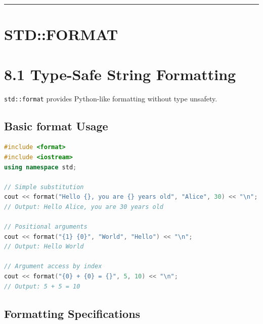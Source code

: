 \begin{center}\rule{0.5\linewidth}{0.5pt}\end{center}

\hypertarget{stdformat}{%
\section{STD::FORMAT}\label{stdformat}}

\hypertarget{type-safe-string-formatting}{%
\section{8.1 Type-Safe String
Formatting}\label{type-safe-string-formatting}}

\passthrough{\lstinline!std::format!} provides Python-like formatting
without type unsafety.

\hypertarget{basic-format-usage}{%
\subsection{Basic format Usage}\label{basic-format-usage}}

\begin{lstlisting}[language={C++}]
#include <format>
#include <iostream>
using namespace std;

// Simple substitution
cout << format("Hello {}, you are {} years old", "Alice", 30) << "\n";
// Output: Hello Alice, you are 30 years old

// Positional arguments
cout << format("{1} {0}", "World", "Hello") << "\n";
// Output: Hello World

// Argument access by index
cout << format("{0} + {0} = {}", 5, 10) << "\n";
// Output: 5 + 5 = 10
\end{lstlisting}

\hypertarget{formatting-specifications}{%
\subsection{Formatting Specifications}\label{formatting-specifications}}

